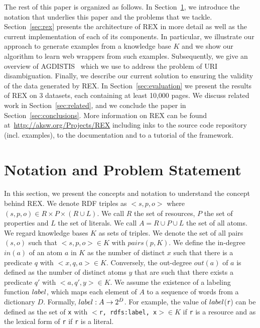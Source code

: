 The rest of this paper is organized as follows. In Section~\ref{sec:notation}, we introduce the notation that underlies this paper and the problems that we tackle. Section~\ref{sec:rex} presents the architecture of REX in more detail as well as the current implementation of each of its components.
In particular, we illustrate our approach to generate examples from a knowledge base $K$ and we show our algorithm to learn web wrappers from such examples.
Subsequently, we give an overview of AGDISTIS~\cite{agdistis_iswc} which we use to address the problem of URI disambiguation. 
Finally, we describe our current solution to ensuring the validity of the data generated by REX. 
In Section~\ref{sec:evaluation} we present the results of REX on 3 datasets, each containing at least 10,000 pages. 
We discuss related work in Section~\ref{sec:related}, and we conclude the paper in Section~\ref{sec:conclusions}. 
More information on REX can be found at~\url{http://aksw.org/Projects/REX} including inks to the source code repository (incl. examples), to the documentation and to a tutorial of the framework.

\section{Notation and Problem Statement}
\label{sec:notation}
In this section, we present the concepts and notation to understand the concept behind REX. We denote RDF triples as $<s, p, o>$ where $(s, p, o) \in R \times P \times (R \cup L)$. We call $R$ the set of resources, $P$ the set of properties and $L$ the set of literals. We call $A = R \cup P \cup L$ the set of all atoms. We regard knowledge bases $K$ as sets of triples. We denote the set of all pairs $(s, o)$ such that $<s, p, o> \in K$ with $pairs(p, K)$.
We define the in-degree $in(a)$ of an atom $a$ in $K$ as the number of distinct $x$ such that there is a predicate $q$ with $<x, q, a> \in K$. Conversely, the out-degree $out(a)$ of $a$ is defined as the number of distinct atoms $y$ that are such that there exists a predicate $q'$ with $<a, q', y> \in K$.
We assume the existence of a labeling function $label$, which maps each element of $A$ to a sequence of words from a dictionary $D$. Formally, $label: A \rightarrow 2^D$. For example, the value of $label$(\texttt{r}) can be defined as the set of \texttt{x} with $<$\texttt{r, rdfs:label, x}$> \in K$ if \texttt{r} is a resource and as the lexical form of  \texttt{r} if  \texttt{r} is a literal.

